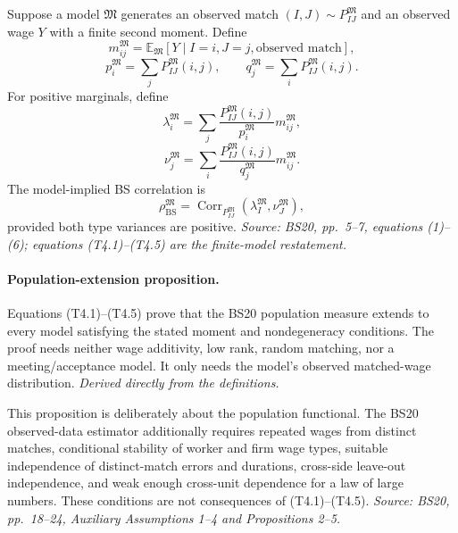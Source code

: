 \documentclass[11pt]{article}
\begin{document}
Suppose a model \(\mathfrak M\) generates an observed match
\((I,J)\sim P^{\mathfrak M}_{IJ}\) and an observed wage \(Y\) with a finite
second moment.  Define
\[
m^{\mathfrak M}_{ij}
=
\mathbb E_{\mathfrak M}[Y\mid I=i,J=j,\text{observed match}],
\tag{T4.1}
\]
\[
p_i^{\mathfrak M}=\sum_jP^{\mathfrak M}_{IJ}(i,j),
\qquad
q_j^{\mathfrak M}=\sum_iP^{\mathfrak M}_{IJ}(i,j).
\tag{T4.2}
\]
For positive marginals, define
\[
\lambda_i^{\mathfrak M}
=
\sum_j
\frac{P^{\mathfrak M}_{IJ}(i,j)}
{p_i^{\mathfrak M}}
m^{\mathfrak M}_{ij},
\tag{T4.3}
\]
\[
\nu_j^{\mathfrak M}
=
\sum_i
\frac{P^{\mathfrak M}_{IJ}(i,j)}
{q_j^{\mathfrak M}}
m^{\mathfrak M}_{ij}.
\tag{T4.4}
\]
The model-implied BS correlation is
\[
\rho_{\mathrm{BS}}^{\mathfrak M}
=
\operatorname{Corr}_{P^{\mathfrak M}_{IJ}}
\left(
\lambda_I^{\mathfrak M},
\nu_J^{\mathfrak M}
\right),
\tag{T4.5}
\]
provided both type variances are positive.
\textit{Source: BS20, pp.\ 5--7, equations (1)--(6); equations
(T4.1)--(T4.5) are the finite-model restatement.}

\paragraph{Population-extension proposition.}
Equations (T4.1)--(T4.5) prove that the BS20 population measure extends to
every model satisfying the stated moment and nondegeneracy conditions.  The
proof needs neither wage additivity, low rank, random matching, nor a
meeting/acceptance model.  It only needs the model's observed matched-wage
distribution.
\textit{Derived directly from the definitions.}

This proposition is deliberately about the population functional.  The BS20
observed-data estimator additionally requires repeated wages from distinct
matches, conditional stability of worker and firm wage types, suitable
independence of distinct-match errors and durations, cross-side leave-out
independence, and weak enough cross-unit dependence for a law of large
numbers.  These conditions are not consequences of (T4.1)--(T4.5).
\textit{Source: BS20, pp.\ 18--24, Auxiliary Assumptions 1--4 and
Propositions 2--5.}
\end{document}
